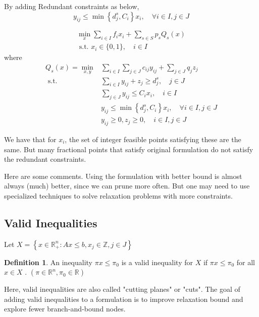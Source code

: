 \documentclass{article}
\theoremstyle{plain}
\theoremstyle{definition}
\newtheorem{definition}[theorem]{Definition}
\begin{document}
By adding  Redundant constraints as below,
$$y_{i j} \leq \min \left\{d_{j}^{s}, C_{i}\right\} x_{i}, \quad \forall i \in I, j \in J$$

\begin{equation}
\begin{array}{l}
\min _{x} \sum_{i \in I} f_{i} x_{i}+\sum_{s \in S} p_{s} Q_{s}(x) \\
\text { s.t. } x_{i} \in\{0,1\}, \quad i \in I
\end{array}
\end{equation}
where
\begin{equation}
\begin{aligned}
Q_{s}(x)=\min _{x, y} & \sum_{i \in I} \sum_{j \in J} c_{i j} y_{i j}+\sum_{j \in J} q_{j} z_{j} \\
\text { s.t. } & \sum_{i \in I} y_{i j}+z_{j} \geq d_{j}^{s}, \quad j \in J \\
& \sum_{j \in J} y_{i j} \leq C_{i} x_{i}, \quad i \in I \\
& y_{i j} \leq \min \left\{d_{j}^{s}, C_{i}\right\} x_{i}, \quad \forall i \in I, j \in J \\
& y_{i j} \geq 0, z_{j} \geq 0, \quad i \in I, j \in J
\end{aligned}
\end{equation}

We have that for $x_i$, the set of integer feasible points satisfying these are the same. But many fractional points that satisfy original formulation do not satisfy the redundant constraints. 

Here are some comments. Using the formulation with better bound is almost always (much) better, since we can prune more often. But one may need to use specialized techniques to solve relaxation problems with more constraints.
\subsection{Valid Inequalities}
Let  $X=\left\{x \in \mathbb{R}_{+}^{n}: A x \leq b, x_{j} \in \mathbb{Z}, j \in J\right\}$ 
\begin{definition}
An inequality  $\pi x \leq \pi_{0}$  is a valid inequality for  $X$  if  $\pi x \leq \pi_{0}$  for all  $x \in X$ .  $\left(\pi \in \mathbb{R}^{n}, \pi_{0} \in \mathbb{R}\right) $
\end{definition}

Here, valid inequalities are also called "cutting planes" or "cuts".  The goal of adding valid inequalities to a formulation is to improve relaxation bound and explore fewer branch-and-bound nodes.
\end{document}
